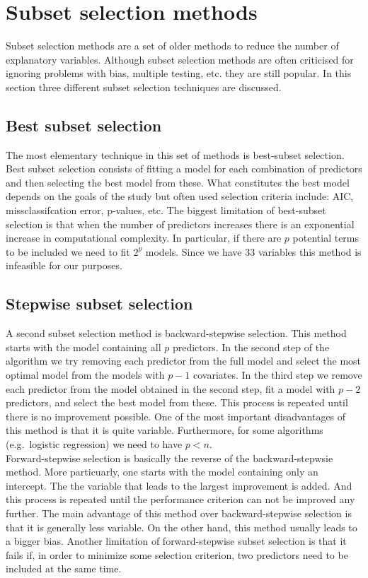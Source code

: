 \section{Subset selection methods}
\label{sec:SubsetSelectionMethods}
Subset selection methods are a set of older methods to reduce the number of explanatory variables. Although subset selection methods are often criticised for ignoring problems with bias, multiple testing, etc. \parencite{whittingham_why_2006} they are still popular. In this section three different subset selection techniques are discussed. \\

\subsection{Best subset selection}
The most elementary technique in this set of methods is best-subset selection. Best subset selection consists of fitting a model for each combination of predictors and then selecting the best model from these. What constitutes the best model depends on the goals of the study but often used selection criteria include: AIC, missclassifcation error, p-values, etc. The biggest limitation of best-subset selection is that when the number of predictors increases there is an exponential increase in computational complexity. In particular, if there are $p$ potential terms to be included we need to fit $2^p$ models. Since we have $33$ variables this method is infeasible for our purposes.\\

\subsection{Stepwise subset selection}
A second subset selection method is backward-stepwise selection. This method starts with the model containing all $p$ predictors. In the second step of the algorithm we try removing each predictor from the full model and select the most optimal model from the models with $p-1$ covariates. In the third step we remove each predictor from the model obtained in the second step, fit a model with $p-2$ predictors, and select the best model from these. This process is repeated until there is no improvement possible. One of the most important disadvantages of this method is that it is quite variable. Furthermore, for some algorithms (e.g.\ logistic regression) we need to have $p < n$.
\\

Forward-stepwise selection is basically the reverse of the backward-stepwsie method. More particuarly, one starts with the model containing only an intercept. The the variable that leads to the largest improvement is added. And this process is repeated until the performance criterion can not be improved any further. The main advantage of this method over backward-stepwise selection is that it is generally less variable. On the other hand, this method usually leads to a bigger bias. Another limitation of forward-stepwise subset selection is that it fails if, in order to minimize some selection criterion, two predictors need to be included at the same time.\\

